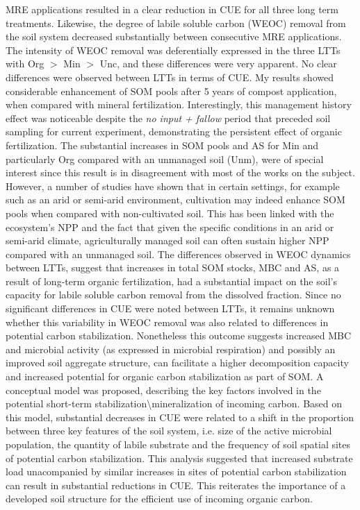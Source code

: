 	MRE applications resulted in a clear reduction in CUE for all three long term treatments. Likewise, the degree of labile soluble carbon (WEOC) removal from the soil system decreased substantially between consecutive MRE applications. The intensity of WEOC removal was deferentially expressed in the three LTTs with Org $  > $ Min $ > $ Unc, and these differences were very apparent. No clear differences were observed between LTTs in terms of CUE.
	My results showed considerable enhancement of SOM pools after 5 years of compost application, when compared with mineral fertilization. Interestingly, this management history effect was noticeable despite the \textit{no input + fallow} period that preceded soil sampling for current experiment, demonstrating the persistent effect of organic fertilization. The substantial increases in SOM pools and AS for Min and particularly Org compared with an unmanaged soil (Unm), were of special interest since this result is in disagreement with most of the works on the subject. However, a number of studies have shown that in certain settings, for example such as an arid or semi-arid environment, cultivation may indeed enhance SOM pools when compared with non-cultivated soil. This has been linked with the ecosystem's NPP and the fact that given the specific conditions in an arid or semi-arid climate, agriculturally managed soil can often sustain higher NPP compared with an unmanaged soil.
	The differences observed in WEOC dynamics between LTTs, suggest that increases in total SOM stocks, MBC and AS, as a result of long-term organic fertilization, had a substantial impact on the soil's capacity for labile soluble carbon removal from the dissolved fraction. Since no significant differences in CUE were noted between LTTs, it remains unknown whether this variability in WEOC removal was also related to differences in potential carbon stabilization. Nonetheless this outcome suggests increased MBC and microbial activity (as expressed in microbial respiration) and possibly an improved soil aggregate structure, can facilitate a higher decomposition capacity and increased potential for organic carbon stabilization as part of SOM.
	A conceptual model was proposed, describing the key factors involved in the potential short-term stabilization\textbackslash mineralization of incoming carbon. Based on this model, substantial decreases in CUE were related to a shift in the proportion between three key features of the soil system, i.e. size of the active microbial population, the quantity of labile substrate and the frequency of soil spatial sites of potential carbon stabilization. This analysis suggested that increased substrate load unacompanied by similar increases in sites of potential carbon stabilization can result in substantial reductions in CUE. This reiterates the importance of a developed soil structure for the efficient use of incoming organic carbon.
	         
	
	
     